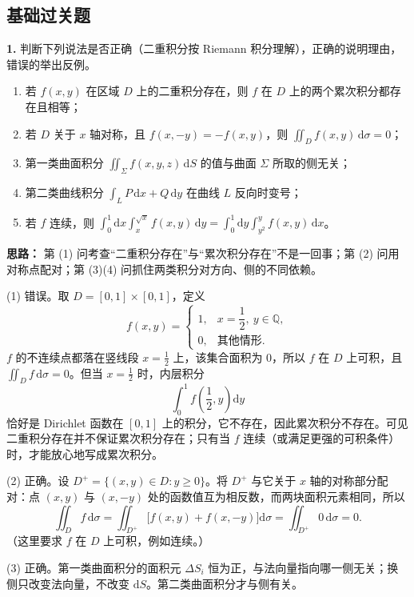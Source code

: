 \subsection{基础过关题}

\textbf{1.} 判断下列说法是否正确（二重积分按 Riemann 积分理解），正确的说明理由，错误的举出反例。
\begin{enumerate}
  \item[(1)] 若 $f(x,y)$ 在区域 $D$ 上的二重积分存在，则 $f$ 在 $D$ 上的两个累次积分都存在且相等；
  \item[(2)] 若 $D$ 关于 $x$ 轴对称，且 $f(x,-y)=-f(x,y)$，则 $\displaystyle\iint_D f(x,y)\,\mathrm{d}\sigma=0$；
  \item[(3)] 第一类曲面积分 $\displaystyle\iint_\Sigma f(x,y,z)\,\mathrm{d}S$ 的值与曲面 $\Sigma$ 所取的侧无关；
  \item[(4)] 第二类曲线积分 $\displaystyle\int_L P\,\mathrm{d}x+Q\,\mathrm{d}y$ 在曲线 $L$ 反向时变号；
  \item[(5)] 若 $f$ 连续，则 $\displaystyle\int_0^1\mathrm{d}x\int_x^{\sqrt x}f(x,y)\,\mathrm{d}y
  =\int_0^1\mathrm{d}y\int_{y^2}^{y}f(x,y)\,\mathrm{d}x$。
\end{enumerate}

\ifshowsolutions%
\textbf{思路：} 第 (1) 问考查“二重积分存在”与“累次积分存在”不是一回事；第 (2) 问用对称点配对；第 (3)(4) 问抓住两类积分对方向、侧的不同依赖。

(1) 错误。取 $D=[0,1]\times[0,1]$，定义
\[
f(x,y)=\begin{cases}
1, & x=\dfrac12,\ y\in\mathbb{Q},\\[4pt]
0, & \text{其他情形}.
\end{cases}
\]
$f$ 的不连续点都落在竖线段 $x=\frac12$ 上，该集合面积为 $0$，所以 $f$ 在 $D$ 上可积，且 $\iint_D f\,\mathrm{d}\sigma=0$。但当 $x=\frac12$ 时，内层积分
\[
\int_0^1 f\!\left(\frac12,y\right)\mathrm{d}y
\]
恰好是 Dirichlet 函数在 $[0,1]$ 上的积分，它不存在，因此累次积分不存在。可见二重积分存在并不保证累次积分存在；只有当 $f$ 连续（或满足更强的可积条件）时，才能放心地写成累次积分。

(2) 正确。设 $D^+=\{(x,y)\in D:y\ge0\}$。将 $D^+$ 与它关于 $x$ 轴的对称部分配对：点 $(x,y)$ 与 $(x,-y)$ 处的函数值互为相反数，而两块面积元素相同，所以
\[
\iint_D f\,\mathrm{d}\sigma
=\iint_{D^+}\bigl[f(x,y)+f(x,-y)\bigr]\mathrm{d}\sigma
=\iint_{D^+}0\,\mathrm{d}\sigma=0.
\]
（这里要求 $f$ 在 $D$ 上可积，例如连续。）

(3) 正确。第一类曲面积分的面积元 $\Delta S_i$ 恒为正，与法向量指向哪一侧无关；换侧只改变法向量，不改变 $\mathrm{d}S$。第二类曲面积分才与侧有关。

